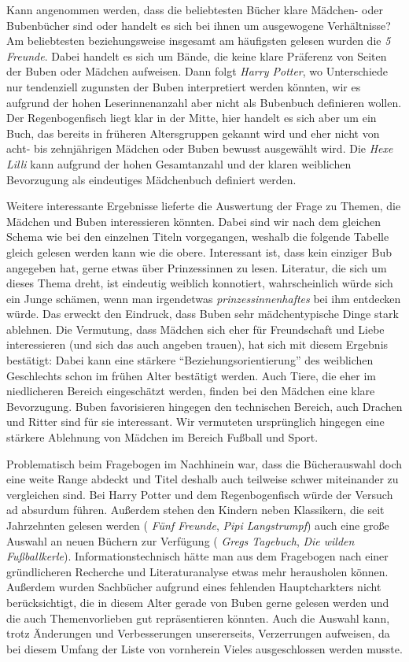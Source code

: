 Kann angenommen werden, dass die beliebtesten Bücher klare Mädchen- oder
Bubenbücher sind oder handelt es sich bei ihnen um ausgewogene
Verhältnisse? Am beliebtesten beziehungsweise insgesamt am häufigsten
gelesen wurden die \emph{5 Freunde}. Dabei handelt es sich um Bände, die
keine klare Präferenz von Seiten der Buben oder Mädchen aufweisen. Dann
folgt \emph{Harry Potter}, wo Unterschiede nur tendenziell zugunsten der
Buben interpretiert werden könnten, wir es aufgrund der hohen
Leserinnenanzahl aber nicht als Bubenbuch definieren wollen. Der
Regenbogenfisch liegt klar in der Mitte, hier handelt es sich aber um
ein Buch, das bereits in früheren Altersgruppen gekannt wird und eher
nicht von acht- bis zehnjährigen Mädchen oder Buben bewusst ausgewählt
wird. Die \emph{Hexe Lilli} kann aufgrund der hohen Gesamtanzahl und der
klaren weiblichen Bevorzugung als eindeutiges Mädchenbuch definiert
werden.

Weitere interessante Ergebnisse lieferte die Auswertung der Frage zu
Themen, die Mädchen und Buben interessieren könnten. Dabei sind wir nach
dem gleichen Schema wie bei den einzelnen Titeln vorgegangen, weshalb
die folgende Tabelle gleich gelesen werden kann wie die obere.
Interessant ist, dass kein einziger Bub angegeben hat, gerne etwas über
Prinzessinnen zu lesen. Literatur, die sich um dieses Thema dreht, ist
eindeutig weiblich konnotiert, wahrscheinlich würde sich ein Junge
schämen, wenn man irgendetwas \emph{prinzessinnenhaftes} bei ihm
entdecken würde. Das erweckt den Eindruck, dass Buben sehr
mädchentypische Dinge stark ablehnen. Die Vermutung, dass Mädchen sich
eher für Freundschaft und Liebe interessieren (und sich das auch angeben
trauen), hat sich mit diesem Ergebnis bestätigt: Dabei kann eine
stärkere ``Beziehungsorientierung'' des weiblichen Geschlechts schon im
frühen Alter bestätigt werden. Auch Tiere, die eher im niedlicheren
Bereich eingeschätzt werden, finden bei den Mädchen eine klare
Bevorzugung. Buben favorisieren hingegen den technischen Bereich, auch
Drachen und Ritter sind für sie interessant. Wir vermuteten ursprünglich
hingegen eine stärkere Ablehnung von Mädchen im Bereich Fußball und
Sport.



Problematisch beim Fragebogen im Nachhinein war, dass die Bücherauswahl
doch eine weite Range abdeckt und Titel deshalb auch teilweise schwer
miteinander zu vergleichen sind. Bei Harry Potter und dem
Regenbogenfisch würde der Versuch ad absurdum führen. Außerdem stehen
den Kindern neben Klassikern, die seit Jahrzehnten gelesen werden (
\emph{Fünf Freunde}, \emph{Pipi Langstrumpf}) auch eine große Auswahl an
neuen Büchern zur Verfügung ( \emph{Gregs Tagebuch}, \emph{Die wilden
Fußballkerle}). Informationstechnisch hätte man aus dem Fragebogen nach
einer gründlicheren Recherche und Literaturanalyse etwas mehr
herausholen können. Außerdem wurden Sachbücher aufgrund eines fehlenden
Hauptcharkters nicht berücksichtigt, die in diesem Alter gerade von
Buben gerne gelesen werden und die auch Themenvorlieben gut
repräsentieren könnten. Auch die Auswahl kann, trotz Änderungen und
Verbesserungen unsererseits, Verzerrungen aufweisen, da bei diesem
Umfang der Liste von vornherein Vieles ausgeschlossen werden musste.

